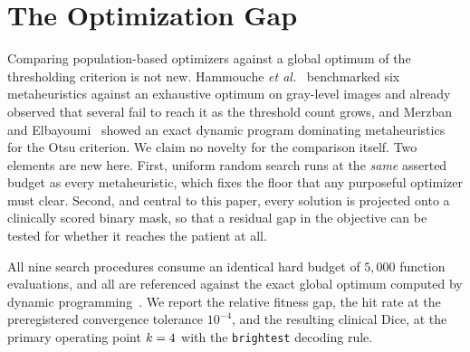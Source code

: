 %
\section{The Optimization Gap}
\label{sec:r1}

Comparing population-based optimizers against a global optimum of the
thresholding criterion is not new. Hammouche \emph{et al.}~\cite{hammouche_eaai}
benchmarked six metaheuristics against an exhaustive optimum on gray-level images
and already observed that several fail to reach it as the threshold count grows,
and Merzban and Elbayoumi~\cite{merzban_eswa} showed an exact dynamic program
dominating metaheuristics for the Otsu criterion. We claim no novelty for the
comparison itself. Two elements are new here. First, uniform random search runs
at the \emph{same} asserted budget as every metaheuristic, which fixes the floor
that any purposeful optimizer must clear. Second, and central to this paper,
every solution is projected onto a clinically scored binary mask, so that a
residual gap in the objective can be tested for whether it reaches the patient at
all.

All nine search procedures consume an identical hard budget of $5{,}000$ function
evaluations, and all are referenced against the exact global optimum computed by
dynamic programming~\cite{menotti_ciarp}. We report the relative fitness gap, the
hit rate at the preregistered convergence tolerance $10^{-4}$, and the resulting
clinical Dice, at the primary operating point $k=4$ with the
\texttt{brightest} decoding rule.


